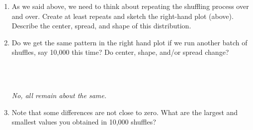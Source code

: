 \begin{enumerate}
\begin{enumerate}
\begin{key}
 {\it centered about zero?}
\end{key}
\end{enumerate}

\item As we said above, we need to think about repeating the shuffling
  process over and over.  Create at least   repeats and sketch the
  right-hand plot (above).  Describe the center,
  spread, and shape of this distribution.

\item Do we get the same pattern in the right hand plot if we run
  another batch of shuffles, say 10,000 this time?    Do
  center, shape, and/or spread change?
\begin{students}
        \vspace{2cm}\\
\end{students}
\begin{key}
  \\ {\it  No, all remain about the same.}
\end{key}


\item Note that some differences are not close to zero.  What are the
  largest and smallest values you obtained in 10,000 shuffles?
\begin{students}
        \vspace{.8cm}\\
\end{students}


\end{enumerate}
